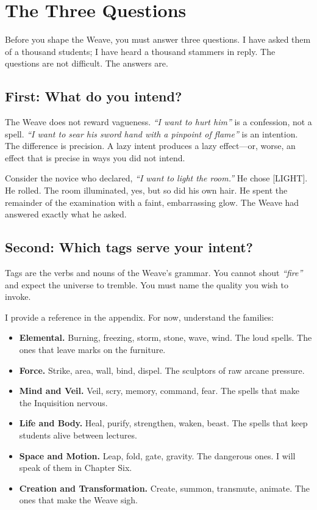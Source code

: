 \section{The Three Questions}

Before you shape the Weave, you must answer three questions. I have asked them of a thousand students; I have heard a thousand stammers in reply. The questions are not difficult. The answers are.

\subsection{First: What do you intend?}

The Weave does not reward vagueness. \emph{``I want to hurt him''} is a confession, not a spell. \emph{``I want to sear his sword hand with a pinpoint of flame''} is an intention. The difference is precision. A lazy intent produces a lazy effect---or, worse, an effect that is precise in ways you did not intend.

Consider the novice who declared, \emph{``I want to light the room.''} He chose [LIGHT]. He rolled. The room illuminated, yes, but so did his own hair. He spent the remainder of the examination with a faint, embarrassing glow. The Weave had answered exactly what he asked.

\subsection{Second: Which tags serve your intent?}

Tags are the verbs and nouns of the Weave's grammar. You cannot shout \emph{``fire''} and expect the universe to tremble. You must name the quality you wish to invoke.

I provide a reference in the appendix. For now, understand the families:

\begin{itemize}
    \item \textbf{Elemental.} Burning, freezing, storm, stone, wave, wind. The loud spells. The ones that leave marks on the furniture.
    \item \textbf{Force.} Strike, area, wall, bind, dispel. The sculptors of raw arcane pressure.
    \item \textbf{Mind and Veil.} Veil, scry, memory, command, fear. The spells that make the Inquisition nervous.
    \item \textbf{Life and Body.} Heal, purify, strengthen, waken, beast. The spells that keep students alive between lectures.
    \item \textbf{Space and Motion.} Leap, fold, gate, gravity. The dangerous ones. I will speak of them in Chapter Six.
    \item \textbf{Creation and Transformation.} Create, summon, transmute, animate. The ones that make the Weave sigh.
\end{itemize}


